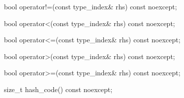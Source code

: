 %
\begin{itemdecl}
bool operator!=(const type_index& rhs) const noexcept;
\end{itemdecl}

\begin{itemdescr}
\pnum
\returns {}
\end{itemdescr}

%
\begin{itemdecl}
bool operator<(const type_index& rhs) const noexcept;
\end{itemdecl}

\begin{itemdescr}
\pnum
\returns {}
\end{itemdescr}

%
\begin{itemdecl}
bool operator<=(const type_index& rhs) const noexcept;
\end{itemdecl}

\begin{itemdescr}
\pnum
\returns {}
\end{itemdescr}

%
\begin{itemdecl}
bool operator>(const type_index& rhs) const noexcept;
\end{itemdecl}

\begin{itemdescr}
\pnum
\returns {}
\end{itemdescr}

%
\begin{itemdecl}
bool operator>=(const type_index& rhs) const noexcept;
\end{itemdecl}

\begin{itemdescr}
\pnum
\returns {}
\end{itemdescr}

%
\begin{itemdecl}
size_t hash_code() const noexcept;
\end{itemdecl}

\begin{itemdescr}
\pnum
\returns {}
\end{itemdescr}

